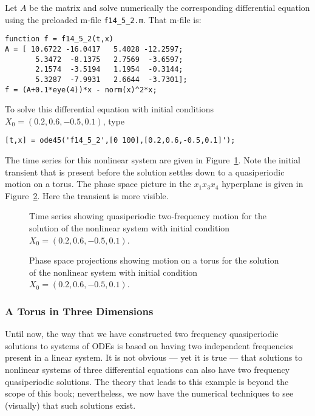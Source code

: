 Let $A$ be the matrix  and solve numerically the corresponding
differential equation  using the preloaded m-file 
{\tt f14\_5\_2.m}. That m-file is:
\begin{verbatim}
function f = f14_5_2(t,x)
A = [ 10.6722 -16.0417   5.4028 -12.2597;
       5.3472  -8.1375   2.7569  -3.6597;
       2.1574  -3.5194   1.1954  -0.3144;
       5.3287  -7.9931   2.6644  -3.7301];
f = (A+0.1*eye(4))*x - norm(x)^2*x;
\end{verbatim}
To solve this differential equation with initial conditions 
$X_0=(0.2,0.6,-0.5,0.1)$, type
\begin{verbatim}
[t,x] = ode45('f14_5_2',[0 100],[0.2,0.6,-0.5,0.1]');
\end{verbatim}

The time series for this nonlinear system are given in Figure~\ref{F:tornlts}.
Note the initial transient that is present before the solution settles 
down to a quasiperiodic motion on a torus.
  The phase space picture in the $x_1x_3x_4$ hyperplane is given 
in Figure~\ref{F:tornlps}.  Here the transient is more visible.
 
\begin{figure}[htb]
   \centerline{%
   }
   \caption{Time series showing quasiperiodic two-frequency motion for the 
	solution of the nonlinear system \protect{} with 
	initial condition $X_0=(0.2,0.6,-0.5,0.1)$.}
   \label{F:tornlts}
\end{figure}

\begin{figure}[htb]
   \centerline{%
   }
   \caption{Phase space projections showing motion on a torus for the 
	solution of the nonlinear system \protect{} with 
	initial condition $X_0=(0.2,0.6,-0.5,0.1)$.}
   \label{F:tornlps}
\end{figure}



\subsubsection*{A Torus in Three Dimensions}

Until now, the way that we have constructed two frequency quasiperiodic 
solutions to systems of ODEs is based on having two independent frequencies 
present in a linear system.  It is not obvious --- yet it is true --- 
that solutions to nonlinear systems of three differential equations 
can also have two frequency quasiperiodic 
solutions.  The theory that 
leads to this example is beyond the scope of this book; nevertheless, we
now have the numerical techniques to see (visually) that such solutions 
exist.

